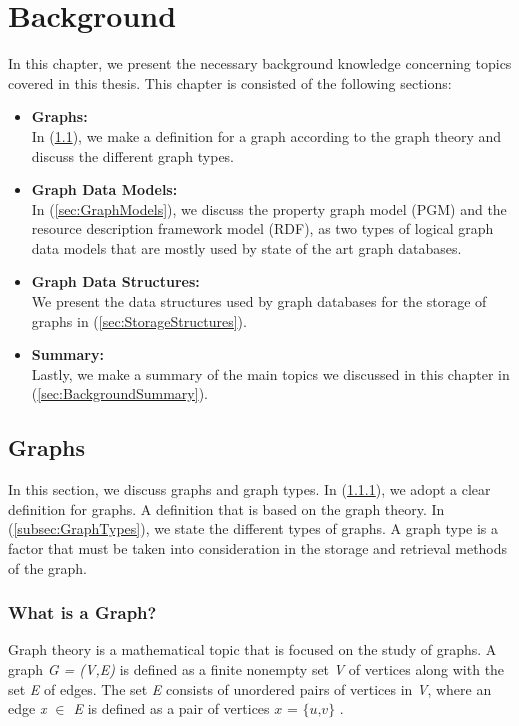 {\chapter{Background}
\label{chap:Background}

In this chapter, we present the necessary background knowledge concerning topics covered in this thesis. This chapter is consisted of the following sections: 

\begin{itemize}  
\item\textbf{Graphs:}\\
In (\ref{sec:Graphs}), we make a definition for a graph according to the graph theory and discuss the different graph types.

\item \textbf{Graph Data Models:}\\
In (\ref{sec:GraphModels}), we discuss the property graph model (PGM) and the resource description framework model (RDF), as two types of logical graph data models that are mostly used by state of the art graph databases.

\item \textbf{Graph Data Structures:}\\
We present the data structures used by graph databases for the storage of graphs in (\ref{sec:StorageStructures}).

\item \textbf{Summary:}\\
Lastly, we make a summary of the main topics we discussed in this chapter in (\ref{sec:BackgroundSummary}).
\end{itemize}

\section{Graphs}
\label{sec:Graphs}
In this section, we discuss graphs and graph  types. In (\ref{subsec:Graph?}), we adopt a clear definition for graphs. A definition that is based on the graph theory. In (\ref{subsec:GraphTypes}), we state the different types of graphs. A graph type is a factor that must be taken into consideration in the storage and retrieval methods of the graph.

\subsection{What is a Graph?}
\label{subsec:Graph?}
Graph theory is a mathematical topic that is focused on the study of graphs. A graph \textit{G = (V,E)} is defined as a finite nonempty set \textit{V} of vertices along with the set \textit{E} of edges. The set \textit{E} consists of unordered pairs of vertices in \textit{V}, where an edge \textit{x \(\in\) E} is defined as a pair of vertices \(\textit{x = \{u,v\}}\) \cite{harary6graph}.

}
